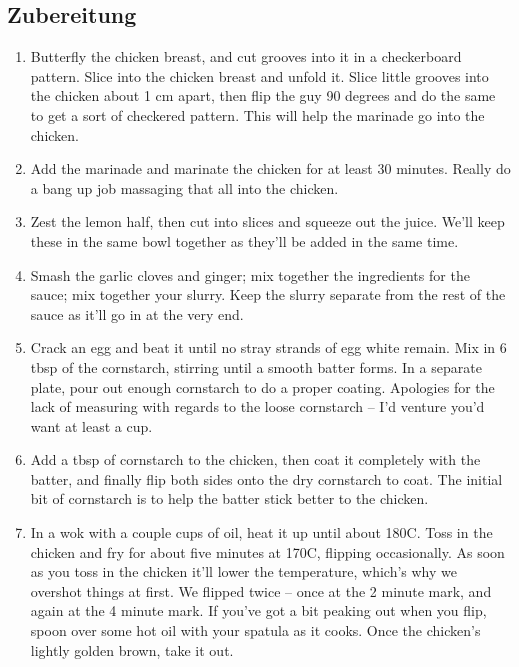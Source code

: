 \begin{minipage}[t]{0.58\textwidth}
\vspace{0pt}
\subsection*{Zubereitung}
\begin{enumerate}[leftmargin=*, itemindent=14pt]
\item Butterfly the chicken breast, and cut grooves into it in a checkerboard
pattern. Slice into the chicken breast and unfold it. Slice little grooves into
the chicken about 1 cm apart, then flip the guy 90 degrees and do the same to
get a sort of checkered pattern. This will help the marinade go into the
chicken.

\item Add the marinade and marinate the chicken for at least 30 minutes.  Really
do a bang up job massaging that all into the chicken. 

\item Zest the lemon half, then cut into slices and squeeze out the juice. We’ll
keep these in the same bowl together as they’ll be added in the same time.

\item Smash the garlic cloves and ginger; mix together the ingredients for the
sauce; mix together your slurry. Keep the slurry separate from the rest of the
sauce as it’ll go in at the very end.

\item Crack an egg and beat it until no stray strands of egg white remain. Mix
in 6 tbsp of the cornstarch, stirring until a smooth batter forms.  In a
separate plate, pour out enough cornstarch to do a proper coating.  Apologies
for the lack of measuring with regards to the loose cornstarch – I’d venture
you’d want at least a cup.

\item Add a tbsp of cornstarch to the chicken, then coat it completely with the
batter, and finally flip both sides onto the dry cornstarch to coat. The initial
bit of cornstarch is to help the batter stick better to the chicken.

\item In a wok with a couple cups of oil, heat it up until about 180C. Toss in
the chicken and fry for about five minutes at 170C, flipping occasionally. As
soon as you toss in the chicken it’ll lower the temperature, which’s why we
overshot things at first. We flipped twice – once at the 2 minute mark, and
again at the 4 minute mark. If you’ve got a bit peaking out when you flip, spoon
over some hot oil with your spatula as it cooks. Once the chicken’s lightly
golden brown, take it out.


\end{enumerate}
\end{minipage}

